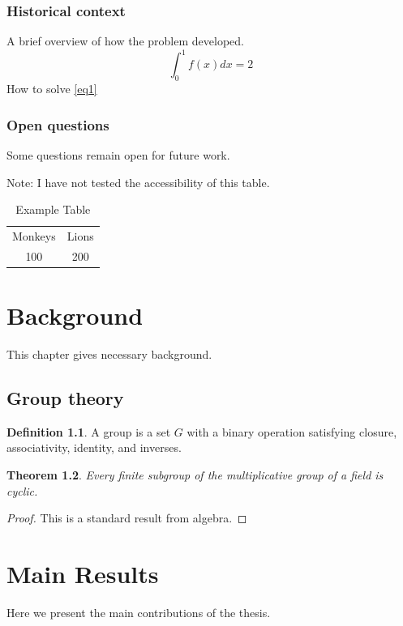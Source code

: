 \documentclass[12pt,reqno,oneside]{amsbook}
\newtheorem{theorem}{Theorem}[chapter]
\theoremstyle{definition}
\newtheorem{definition}[theorem]{Definition}
\begin{document}

\subsection{Historical context}
A brief overview of how the problem developed.
\begin{equation}\label{eq1}\int_0^1 f(x) dx = 2\end{equation}
How to solve \eqref{eq1}
\subsection{Open questions}
Some questions remain open for future work.

Note: I have not tested the accessibility of this table.
\begin{table}[h]
\centering
\begin{tabular}{cc}
Monkeys & Lions \\
100 & 200
\end{tabular}
\caption{Example Table}
\end{table}


\chapter{Background}
This chapter gives necessary background.

\section{Group theory}
\begin{definition}
A group is a set $G$ with a binary operation satisfying closure, associativity, identity, and inverses.
\end{definition}

\begin{theorem}
Every finite subgroup of the multiplicative group of a field is cyclic.
\end{theorem}

\begin{proof}
This is a standard result from algebra.
\end{proof}

\chapter{Main Results}
Here we present the main contributions of the thesis.
\end{document}
